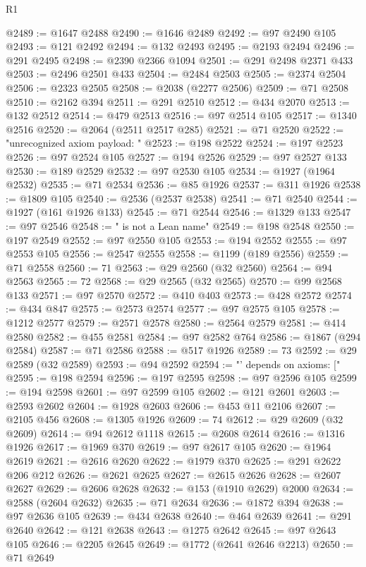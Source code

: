 \begin{lexlean}{R1}
\begin{coremodule}
@2489 := @1647 @2488
@2490 := @1646 @2489
@2492 := @97 @2490 @105
@2493 := @121 @2492
@2494 := @132 @2493
@2495 := @2193 @2494
@2496 := @291 @2495
@2498 := @2390 @2366 @1094
@2501 := @291 @2498 @2371 @433
@2503 := @2496 @2501 @433
@2504 := @2484 @2503
@2505 := @2374 @2504
@2506 := @2323 @2505
@2508 := @2038 (@2277 @2506)
@2509 := @71 @2508
@2510 := @2162 @394
@2511 := @291 @2510
@2512 := @434 @2070
@2513 := @132 @2512
@2514 := @479 @2513
@2516 := @97 @2514 @105
@2517 := @1340 @2516
@2520 := @2064 (@2511 @2517 @285)
@2521 := @71 @2520
@2522 := "unrecognized axiom payload: "
@2523 := @198 @2522
@2524 := @197 @2523
@2526 := @97 @2524 @105
@2527 := @194 @2526
@2529 := @97 @2527 @133
@2530 := @189 @2529
@2532 := @97 @2530 @105
@2534 := @1927 (@1964 @2532)
@2535 := @71 @2534
@2536 := @85 @1926
@2537 := @311 @1926
@2538 := @1809 @105
@2540 := @2536 (@2537 @2538)
@2541 := @71 @2540
@2544 := @1927 (@161 @1926 @133)
@2545 := @71 @2544
@2546 := @1329 @133
@2547 := @97 @2546
@2548 := " is not a Lean name"
@2549 := @198 @2548
@2550 := @197 @2549
@2552 := @97 @2550 @105
@2553 := @194 @2552
@2555 := @97 @2553 @105
@2556 := @2547 @2555
@2558 := @1199 (@189 @2556)
@2559 := @71 @2558
@2560 := 71
@2563 := @29 @2560 (@32 @2560)
@2564 := @94 @2563
@2565 := 72
@2568 := @29 @2565 (@32 @2565)
@2570 := @99 @2568 @133
@2571 := @97 @2570
@2572 := @410 @403
@2573 := @428 @2572
@2574 := @434 @847
@2575 := @2573 @2574
@2577 := @97 @2575 @105
@2578 := @1212 @2577
@2579 := @2571 @2578
@2580 := @2564 @2579
@2581 := @414 @2580
@2582 := @455 @2581
@2584 := @97 @2582 @764
@2586 := @1867 (@294 @2584)
@2587 := @71 @2586
@2588 := @517 @1926
@2589 := 73
@2592 := @29 @2589 (@32 @2589)
@2593 := @94 @2592
@2594 := "' depends on axioms: ["
@2595 := @198 @2594
@2596 := @197 @2595
@2598 := @97 @2596 @105
@2599 := @194 @2598
@2601 := @97 @2599 @105
@2602 := @121 @2601
@2603 := @2593 @2602
@2604 := @1928 @2603
@2606 := @453 @11 @2106
@2607 := @2105 @456
@2608 := @1305 @1926
@2609 := 74
@2612 := @29 @2609 (@32 @2609)
@2614 := @94 @2612 @1118
@2615 := @2608 @2614
@2616 := @1316 @1926
@2617 := @1969 @370
@2619 := @97 @2617 @105
@2620 := @1964 @2619
@2621 := @2616 @2620
@2622 := @1979 @370
@2625 := @291 @2622 @206 @212
@2626 := @2621 @2625
@2627 := @2615 @2626
@2628 := @2607 @2627
@2629 := @2606 @2628
@2632 := @153 (@1910 @2629) @2000
@2634 := @2588 (@2604 @2632)
@2635 := @71 @2634
@2636 := @1872 @394
@2638 := @97 @2636 @105
@2639 := @434 @2638
@2640 := @464 @2639
@2641 := @291 @2640
@2642 := @121 @2638
@2643 := @1275 @2642
@2645 := @97 @2643 @105
@2646 := @2205 @2645
@2649 := @1772 (@2641 @2646 @2213)
@2650 := @71 @2649

\end{coremodule}
\end{lexlean}
